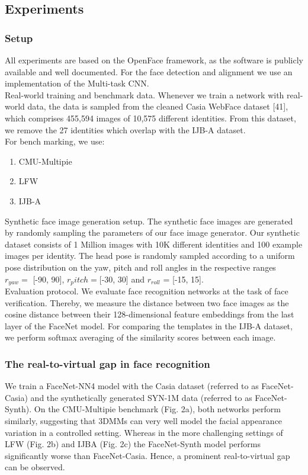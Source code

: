 \documentclass[12pt]{article}
\begin{document}
\subsection{Experiments}
\subsubsection{Setup}
All experiments are based on the OpenFace framework, as the software is publicly available and well documented.
For the face detection and alignment we use an implementation
of the Multi-task CNN.\\
Real-world training and benchmark data. Whenever we
train a network with real-world data, the data is sampled
from the cleaned Casia WebFace dataset [41], which comprises 455,594 images of 10,575 different identities. From this
dataset, we remove the 27 identities which overlap with the
IJB-A dataset.\\
For bench marking, we use:
\begin{enumerate}
  \item CMU-Multipie
  \item LFW
  \item IJB-A
\end{enumerate}
Synthetic face image generation setup. The synthetic face
images are generated by randomly sampling the parameters of
our face image generator. Our synthetic dataset
consists of 1 Million images with 10K different identities and 100 example images per identity. The head pose is randomly sampled according to a uniform pose distribution on the yaw, pitch
and roll angles in the respective ranges $r_{yaw} =$ [-90, 90], $r_pitch = $[-30, 30] and $r_{roll}$ = [-15, 15].\\
Evaluation protocol. We evaluate face recognition networks at
the task of face verification. Thereby, we measure the distance
between two face images as the cosine distance between their
128-dimensional feature embeddings from the last layer of the
FaceNet model. For comparing the templates in the IJB-A dataset, we perform
softmax averaging of the similarity scores between each image.
\subsubsection{The real-to-virtual gap in face recognition}
We train a FaceNet-NN4 model with the Casia
dataset (referred to as FaceNet-Casia) and the synthetically
generated SYN-1M data (referred to as FaceNet-Synth). On the CMU-Multipie benchmark (Fig. 2a), both networks perform similarly, suggesting that 3DMMs can very well model
the facial appearance variation in a controlled setting. Whereas
in the more challenging settings of LFW (Fig. 2b) and IJBA (Fig. 2c) the FaceNet-Synth model performs significantly
worse than FaceNet-Casia. Hence, a prominent real-to-virtual
gap can be observed.
\end{document}
